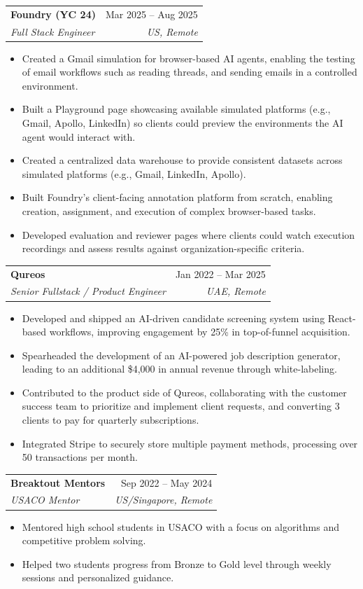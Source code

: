 \documentclass[letterpaper,11pt]{article}
\makeatletter
\newcommand{\resumeItem}[1]{
    \item\small{
      {#1 \vspace{-2pt}}
    }
  }
\newcommand{\resumeSubheading}[4]{
    \vspace{-2pt}\item
      \begin{tabular*}{0.97\textwidth}[t]{l@{\extracolsep{\fill}}r}
        \textbf{#1} & #2 \\
        \textit{\small#3} & \textit{\small #4} \\
      \end{tabular*}\vspace{-7pt}
  }
\newcommand{\resumeItemListStart}{\begin{itemize}}
\newcommand{\resumeItemListEnd}{\end{itemize}\vspace{-5pt}}
\makeatother
\begin{document}
      
      \resumeSubheading
        {Foundry (YC 24)}{Mar 2025 -- Aug 2025}
        {Full Stack Engineer}{US, Remote}
        \resumeItemListStart
          \resumeItem{Created a Gmail simulation for browser-based AI agents, enabling the testing of email workflows such as reading threads, and sending emails in a controlled environment.}
          \resumeItem{Built a Playground page showcasing available simulated platforms (e.g., Gmail, Apollo, LinkedIn) so clients could preview the environments the AI agent would interact with.}
          \resumeItem{Created a centralized data warehouse to provide consistent datasets across simulated platforms (e.g., Gmail, LinkedIn, Apollo).}
          \resumeItem{Built Foundry's client-facing annotation platform from scratch, enabling creation, assignment, and execution of complex browser-based tasks.}
          \resumeItem{Developed evaluation and reviewer pages where clients could watch execution recordings and assess results against organization-specific criteria.}
        \resumeItemListEnd
      \vspace{6pt}
    

      
      \resumeSubheading
        {Qureos}{Jan 2022 -- Mar 2025}
        {Senior Fullstack / Product Engineer}{UAE, Remote}
        \resumeItemListStart
          \resumeItem{Developed and shipped an AI-driven candidate screening system using React-based workflows, improving engagement by 25\% in top-of-funnel acquisition.}
          \resumeItem{Spearheaded the development of an AI-powered job description generator, leading to an additional \$4,000 in annual revenue through white-labeling.}
          \resumeItem{Contributed to the product side of Qureos, collaborating with the customer success team to prioritize and implement client requests, and converting 3 clients to pay for quarterly subscriptions.}
          \resumeItem{Integrated Stripe to securely store multiple payment methods, processing over 50 transactions per month.}
        \resumeItemListEnd
      \vspace{6pt}
    

      
      \resumeSubheading
        {Breaktout Mentors}{Sep 2022 -- May 2024}
        {USACO Mentor}{US/Singapore, Remote}
        \resumeItemListStart
          \resumeItem{Mentored high school students in USACO with a focus on algorithms and competitive problem solving.}
          \resumeItem{Helped two students progress from Bronze to Gold level through weekly sessions and personalized guidance.}
        \resumeItemListEnd
      \vspace{6pt}
    
\end{document}
